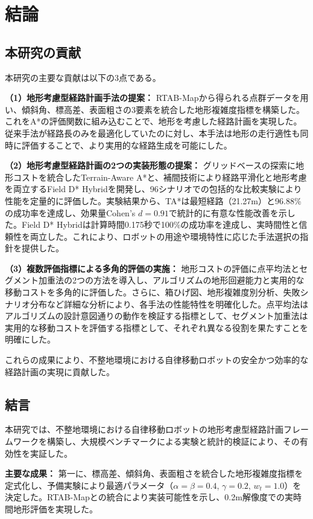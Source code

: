 \chapter{結論}

\section{本研究の貢献}

本研究の主要な貢献は以下の3点である。

\textbf{（1）地形考慮型経路計画手法の提案：}
RTAB-Mapから得られる点群データを用い、傾斜角、標高差、表面粗さの3要素を統合した地形複雑度指標を構築した。これをA*の評価関数に組み込むことで、地形を考慮した経路計画を実現した。従来手法が経路長のみを最適化していたのに対し、本手法は地形の走行適性も同時に評価することで、より実用的な経路生成を可能にした。

\textbf{（2）地形考慮型経路計画の2つの実装形態の提案：}
グリッドベースの探索に地形コストを統合したTerrain-Aware A*と、補間技術により経路平滑化と地形考慮を両立するField D* Hybridを開発し、96シナリオでの包括的な比較実験により性能を定量的に評価した。実験結果から、TA*は最短経路（21.27m）と96.88\%の成功率を達成し、効果量Cohen's $d=0.91$で統計的に有意な性能改善を示した。Field D* Hybridは計算時間0.175秒で100\%の成功率を達成し、実時間性と信頼性を両立した。これにより、ロボットの用途や環境特性に応じた手法選択の指針を提供した。

\textbf{（3）複数評価指標による多角的評価の実施：}
地形コストの評価に点平均法とセグメント加重法の2つの方法を導入し、アルゴリズムの地形回避能力と実用的な移動コストを多角的に評価した。さらに、箱ひげ図、地形複雑度別分析、失敗シナリオ分布など詳細な分析により、各手法の性能特性を明確化した。点平均法はアルゴリズムの設計意図通りの動作を検証する指標として、セグメント加重法は実用的な移動コストを評価する指標として、それぞれ異なる役割を果たすことを明確にした。

これらの成果により、不整地環境における自律移動ロボットの安全かつ効率的な経路計画の実現に貢献した。

\section{結言}

本研究では、不整地環境における自律移動ロボットの地形考慮型経路計画フレームワークを構築し、大規模ベンチマークによる実験と統計的検証により、その有効性を実証した。

\textbf{主要な成果：}
第一に、標高差、傾斜角、表面粗さを統合した地形複雑度指標を定式化し、予備実験により最適パラメータ（$\alpha=\beta=0.4$, $\gamma=0.2$, $w_t=1.0$）を決定した。RTAB-Mapとの統合により実装可能性を示し、0.2m解像度での実時間地形評価を実現した。

